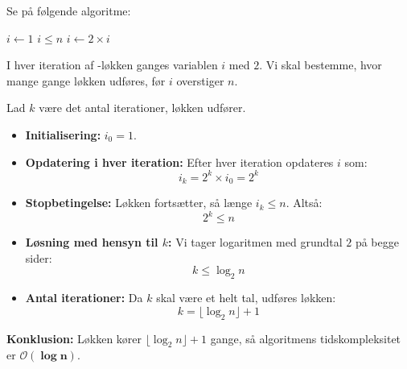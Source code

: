 \begin{example}

    Se på følgende algoritme:
    
    \begin{codebox}
        \li $i \gets 1$
        \li \While $i \leq n$ \Do
        \li     $i \gets 2 \times i$
            \End
    \end{codebox}
    
    I hver iteration af \texttt{\While}-løkken ganges variablen $i$ med $2$. Vi skal bestemme, hvor mange gange løkken udføres, før $i$ overstiger $n$.
    
    Lad $k$ være det antal iterationer, løkken udfører.
    
    \begin{itemize}
        \item \textbf{Initialisering:} $i_0 = 1$.
        \item \textbf{Opdatering i hver iteration:} Efter hver iteration opdateres $i$ som:
        \[ i_k = 2^k \times i_0 = 2^k \]
        \item \textbf{Stopbetingelse:} Løkken fortsætter, så længe $i_k \leq n$. Altså:
        \[ 2^k \leq n \]
        \item \textbf{Løsning med hensyn til $k$:} Vi tager logaritmen med grundtal $2$ på begge sider:
        \[ k \leq \log_2 n \]
        \item \textbf{Antal iterationer:} Da $k$ skal være et helt tal, udføres løkken:
        \[ k = \lfloor \log_2 n \rfloor + 1 \]
    \end{itemize}
    
    \textbf{Konklusion:} Løkken kører $\lfloor \log_2 n \rfloor + 1$ gange, så algoritmens tidskompleksitet er $\boldsymbol{\mathcal{O}(\log n)}$.
            
\end{example}
            

